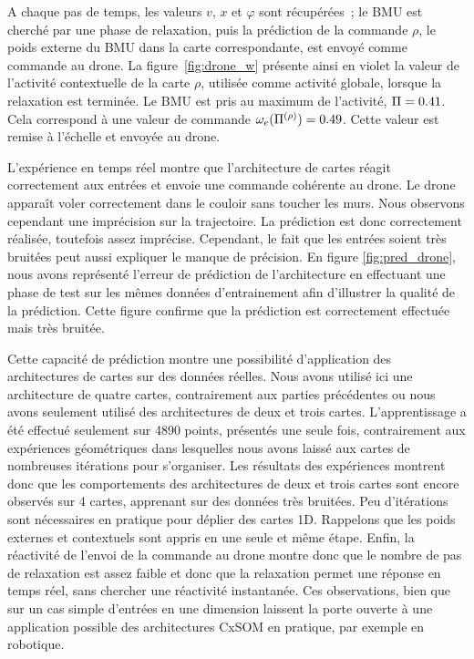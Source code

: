 \documentclass[../main]{subfiles}
\begin{document}
A chaque pas de temps, les valeurs $v$, $x$ et $\varphi$ sont récupérées~; le BMU est cherché par une phase de relaxation, puis la prédiction de la commande $\rho$, le poids externe du BMU dans la carte correspondante, est envoyé comme commande au drone.
La figure~\ref{fig:drone_w} présente ainsi en violet la valeur de l'activité contextuelle de la carte $\rho$, utilisée comme activité globale, lorsque la relaxation est terminée. Le BMU est pris au maximum de l'activité, $\Pi = 0.41$. Cela correspond à une valeur de commande $\omega_e(\Pi^{({\rho})}) = 0.49$. Cette valeur est remise à l'échelle et envoyée au drone.

L'expérience en temps réel montre que l'architecture de cartes réagit correctement aux entrées et envoie une commande cohérente au drone. Le drone apparaît voler correctement dans le couloir sans toucher les murs. Nous observons cependant une imprécision sur la trajectoire. La prédiction est donc correctement réalisée, toutefois assez imprécise. Cependant, le fait que les entrées soient très bruitées peut aussi expliquer le manque de précision. 
En figure \ref{fig:pred_drone}, nous avons représenté l'erreur de prédiction de l'architecture en effectuant une phase de test sur les mêmes données d'entrainement afin d'illustrer la qualité de la prédiction. Cette figure confirme que la prédiction est correctement effectuée mais très bruitée.

Cette capacité de prédiction montre une possibilité d'application des architectures de cartes sur des données réelles. Nous avons utilisé ici une architecture de quatre cartes, contrairement aux parties précédentes ou nous avons seulement utilisé des architectures de deux et trois cartes. 
L'apprentissage a été effectué seulement sur 4890 points, présentés une seule fois, contrairement aux expériences géométriques dans lesquelles nous avons laissé aux cartes de nombreuses itérations pour s'organiser.
Les résultats des expériences montrent donc que les comportements des architectures de deux et trois cartes sont encore observés sur 4 cartes, apprenant sur des données très bruitées. 
Peu d'itérations sont nécessaires en pratique pour déplier des cartes 1D. Rappelons que les poids externes et contextuels sont appris en une seule et même étape.
Enfin, la réactivité de l'envoi de la commande au drone montre donc que le nombre de pas de relaxation est assez faible et donc que la relaxation permet une réponse en temps réel, sans chercher une réactivité instantanée.
Ces observations, bien que sur un cas simple d'entrées en une dimension laissent la porte ouverte à une application possible des architectures CxSOM en pratique, par exemple en robotique.
\end{document}
